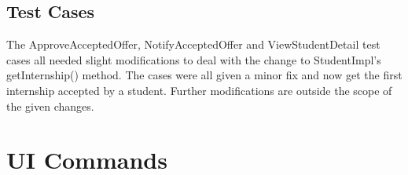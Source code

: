 \documentclass[11pt]{l3deliverable}
\begin{document}
\subsection{Test Cases}

The ApproveAcceptedOffer, NotifyAcceptedOffer and ViewStudentDetail test cases all 
needed slight modifications to deal with the change to StudentImpl's getInternship()
method. The cases were all given a minor fix and now get the first internship accepted
by a student. Further modifications are outside the scope of the given changes. 

\section{UI Commands}
\end{document}
